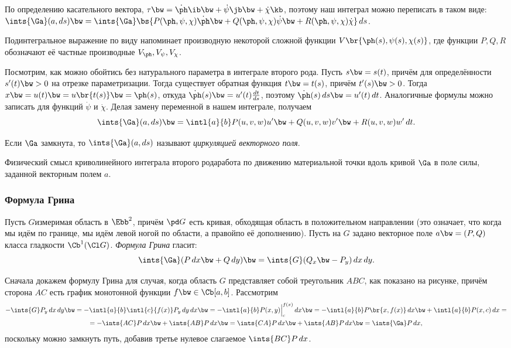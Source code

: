 \documentclass[a4paper]{article}
\begin{document}
По определению касательного вектора, $\tau \bw= \dot{\ph}\ib \bw+ \dot{\psi}\jb \bw+ \dot{\chi}\kb$, поэтому
наш интеграл можно переписать в таком виде: $\ints{\Ga}(a,ds) \bw= \ints{\Ga}\bs{P(\ph,\psi,\chi)\dot{\ph}
\bw+ Q(\ph,\psi,\chi)\dot{\psi} \bw+ R(\ph,\psi,\chi)\dot{\chi}}\,ds$.

\begin{note}
Подинтегральное выражение по виду напоминает производную некоторой сложной функции $V\br{\ph(s),
\psi(s),\chi(s)}$, где функции $P,Q,R$ обозначают её частные производные $V_\ph, V_\psi, V_\chi$.
\end{note}

Посмотрим, как можно обойтись без натурального параметра в интеграле второго рода. Пусть $s \bw= s(t)$,
причём для определённости $s'(t) \bw> 0$ на отрезке параметризации. Тогда существует обратная функция $t \bw=
t(s)$, причём $t'(s) \bw> 0$. Тогда $x \bw= u(t) \bw= u\br{t(s)} \bw= \ph(s)$, откуда $\dot{\ph}(s) \bw=
u'(t)\frac{dt}{ds}$, поэтому $\dot{\ph}(s)\,ds \bw= u'(t)\,dt$. Аналогичные формулы можно записать
для функций $\dot{\psi}$ и $\dot{\chi}$. Делая замену переменной в нашем интеграле, получаем
$$
  \ints{\Ga}(a,ds) \bw= \intl{a}{b} P(u,v,w)u' \bw+ Q(u,v,w)v' \bw+ R(u,v,w)w' \,dt.
$$

\begin{df}
Если $\Ga$ замкнута, то $\ints{\Ga}(a,ds)$ называют \emph{циркуляцией векторного поля}.
\end{df}

\begin{note}
Физический смысл криволинейного интеграла второго рода\т работа по движению материальной точки
вдоль кривой $\Ga$ в поле силы, заданной векторным полем $a$.
\end{note}

\subsubsection{Формула Грина}

Пусть $G$\т измеримая область в $\Ebb^2$, причём $\pd G$ есть кривая, обходящая область в
положительном направлении (это означает, что когда мы идём по границе, мы идём левой ногой по
области, а правой\т по её дополнению). Пусть на $G$ задано векторное поле $a \bw= (P, Q)$ класса
гладкости $\Cb^1(\Cl G)$. \emph{Формула Грина} гласит:
$$\ints{\Ga}(P\,d x \bw+ Q\,d y) \bw= \ints{G}(Q_x \bw- P_y)\,dx\,dy.$$

\hangindent=-38mm
Сначала докажем формулу Грина для случая,
когда область $G$ представляет собой треугольник $ABC$, как показано на рисунке, причём сторона $AC$ есть
график монотонной функции $f \bw\in \Cb[a,b]$. Рассмотрим
\begin{multline*}
-\ints{G}P_y\,dx\,dy \bw=
-\intl{a}{b}\intl{c}{f(x)}P_y\,dy\,dx \bw= -\intl{a}{b}P(x,y)\Bigl\rvert_c^{f(x)}\,dx \bw=
-\intl{a}{b}P\br{x,f(x)}\,dx \bw+\intl{a}{b}P(x,c)\,dx =\\
= -\ints{AC}P\,dx \bw+ \ints{A B}P\,d x \bw= \ints{CA}P\,d x \bw+ \ints{A B}P\,d x \bw= \ints{\Ga}P \,dx,
\end{multline*}
поскольку можно замкнуть путь, добавив третье нулевое слагаемое $\ints{BC}P\,d x$.
\end{document}
